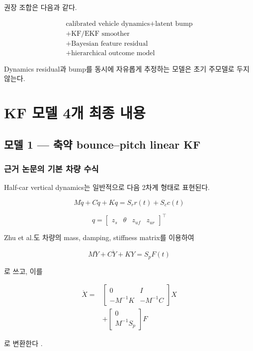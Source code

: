 \documentclass[letterpaper,10pt,journal,twocolumn]{ieeeconf}
\begin{document}
권장 조합은 다음과 같다.

\[
\boxed{
\begin{gathered}
\text{calibrated vehicle dynamics}
+\text{latent bump}\\
+\text{KF/EKF smoother}\\
+\text{Bayesian feature residual}\\
+\text{hierarchical outcome model}
\end{gathered}
}
\]

Dynamics residual과 bump를 동시에 자유롭게 추정하는 모델은 초기 주모델로 두지 않는다.

\section{KF 모델 4개 최종 내용}

\subsection{모델 1 --- 축약 bounce--pitch linear KF}

\subsubsection{근거 논문의 기본 차량 수식}

Half-car vertical dynamics는 일반적으로 다음 2차계 형태로 표현된다.

\[
M\ddot q+C\dot q+Kq
=
S_r r(t)+S_c c(t)
\]

\[
q=
\begin{bmatrix}
z_s&\theta&z_{uf}&z_{ur}
\end{bmatrix}^{\top}
\]

Zhu et al.도 차량의 mass, damping, stiffness matrix를 이용하여

\[
M\ddot Y+C\dot Y+KY=S_pF(t)
\]

로 쓰고, 이를

\[
\begin{aligned}
\dot X
={}&
\begin{bmatrix}
0&I\\
-M^{-1}K&-M^{-1}C
\end{bmatrix}X\\
&+
\begin{bmatrix}
0\\
M^{-1}S_p
\end{bmatrix}F
\end{aligned}
\]

로 변환한다 \cite[eqs.~(7)--(9)]{zhu2022}.
\end{document}
